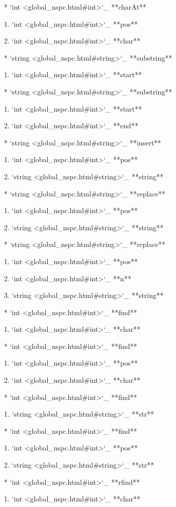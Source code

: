 	* `int <global_nspc.html#int>`_ **charAt**

		1. `int <global_nspc.html#int>`_ **pos**

		2. `int <global_nspc.html#int>`_ **char**

	* `string <global_nspc.html#string>`_ **substring**

		1. `int <global_nspc.html#int>`_ **start**

	* `string <global_nspc.html#string>`_ **substring**

		1. `int <global_nspc.html#int>`_ **start**

		2. `int <global_nspc.html#int>`_ **end**

	* `string <global_nspc.html#string>`_ **insert**

		1. `int <global_nspc.html#int>`_ **pos**

		2. `string <global_nspc.html#string>`_ **string**

	* `string <global_nspc.html#string>`_ **replace**

		1. `int <global_nspc.html#int>`_ **pos**

		2. `string <global_nspc.html#string>`_ **string**

	* `string <global_nspc.html#string>`_ **replace**

		1. `int <global_nspc.html#int>`_ **pos**

		2. `int <global_nspc.html#int>`_ **n**

		3. `string <global_nspc.html#string>`_ **string**

	* `int <global_nspc.html#int>`_ **find**

		1. `int <global_nspc.html#int>`_ **char**

	* `int <global_nspc.html#int>`_ **find**

		1. `int <global_nspc.html#int>`_ **pos**

		2. `int <global_nspc.html#int>`_ **char**

	* `int <global_nspc.html#int>`_ **find**

		1. `string <global_nspc.html#string>`_ **str**

	* `int <global_nspc.html#int>`_ **find**

		1. `int <global_nspc.html#int>`_ **pos**

		2. `string <global_nspc.html#string>`_ **str**

	* `int <global_nspc.html#int>`_ **rfind**

		1. `int <global_nspc.html#int>`_ **char**

